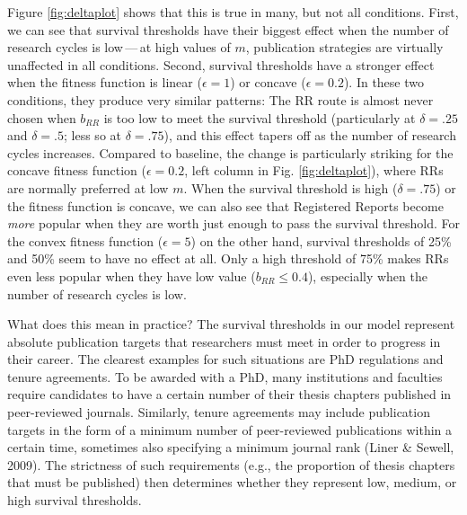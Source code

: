 \documentclass[
  ,man,mask,floatsintext]{apa6}
\begin{document}
Figure \ref{fig:deltaplot} shows that this is true in many, but not all conditions.
First, we can see that survival thresholds have their biggest effect when the number of research cycles is low\(\,\)---\(\,\)at high values of \(m\), publication strategies are virtually unaffected in all conditions.
Second, survival thresholds have a stronger effect when the fitness function is linear (\(\epsilon = 1\)) or concave (\(\epsilon = 0.2\)).
In these two conditions, they produce very similar patterns:
The RR route is almost never chosen when \(b_{RR}\) is too low to meet the survival threshold (particularly at \(\delta = .25\) and \(\delta = .5\); less so at \(\delta = .75\)), and this effect tapers off as the number of research cycles increases.
Compared to baseline, the change is particularly striking for the concave fitness function (\(\epsilon = 0.2\), left column in Fig. \ref{fig:deltaplot}), where RRs are normally preferred at low \(m\).
When the survival threshold is high (\(\delta = .75\)) or the fitness function is concave, we can also see that Registered Reports become \emph{more} popular when they are worth just enough to pass the survival threshold.
For the convex fitness function (\(\epsilon = 5\)) on the other hand, survival thresholds of 25\% and 50\% seem to have no effect at all.
Only a high threshold of 75\% makes RRs even less popular when they have low value (\(b_{RR}\leq 0.4\)), especially when the number of research cycles is low.

What does this mean in practice?
The survival thresholds in our model represent absolute publication targets that researchers must meet in order to progress in their career.
The clearest examples for such situations are PhD regulations and tenure agreements.
To be awarded with a PhD, many institutions and faculties require candidates to have a certain number of their thesis chapters published in peer-reviewed journals.
Similarly, tenure agreements may include publication targets in the form of a minimum number of peer-reviewed publications within a certain time, sometimes also specifying a minimum journal rank (Liner \& Sewell, 2009).
The strictness of such requirements (e.g., the proportion of thesis chapters that must be published) then determines whether they represent low, medium, or high survival thresholds.
\end{document}
